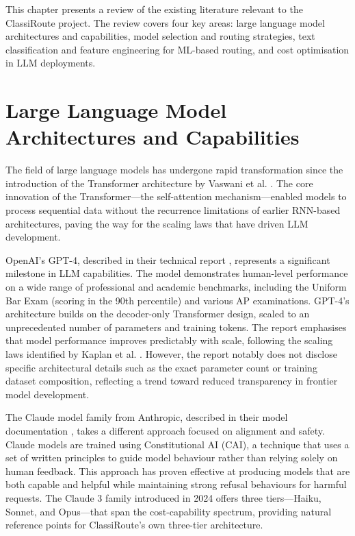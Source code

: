 \documentclass[oneside,12pt,a4paper]{report}
\begin{document}
This chapter presents a review of the existing literature relevant to the ClassiRoute project. The review covers four key areas: large language model architectures and capabilities, model selection and routing strategies, text classification and feature engineering for ML-based routing, and cost optimisation in LLM deployments.

\section{Large Language Model Architectures and Capabilities}

The field of large language models has undergone rapid transformation since the introduction of the Transformer architecture by Vaswani et al. \cite{vaswani2017attention}. The core innovation of the Transformer---the self-attention mechanism---enabled models to process sequential data without the recurrence limitations of earlier RNN-based architectures, paving the way for the scaling laws that have driven LLM development.

OpenAI's GPT-4, described in their technical report \cite{openai-gpt4}, represents a significant milestone in LLM capabilities. The model demonstrates human-level performance on a wide range of professional and academic benchmarks, including the Uniform Bar Exam (scoring in the 90th percentile) and various AP examinations. GPT-4's architecture builds on the decoder-only Transformer design, scaled to an unprecedented number of parameters and training tokens. The report emphasises that model performance improves predictably with scale, following the scaling laws identified by Kaplan et al. \cite{kaplan2020scaling}. However, the report notably does not disclose specific architectural details such as the exact parameter count or training dataset composition, reflecting a trend toward reduced transparency in frontier model development.

The Claude model family from Anthropic, described in their model documentation \cite{anthropic-claude}, takes a different approach focused on alignment and safety. Claude models are trained using Constitutional AI (CAI), a technique that uses a set of written principles to guide model behaviour rather than relying solely on human feedback. This approach has proven effective at producing models that are both capable and helpful while maintaining strong refusal behaviours for harmful requests. The Claude 3 family introduced in 2024 offers three tiers---Haiku, Sonnet, and Opus---that span the cost-capability spectrum, providing natural reference points for ClassiRoute's own three-tier architecture.
\end{document}
